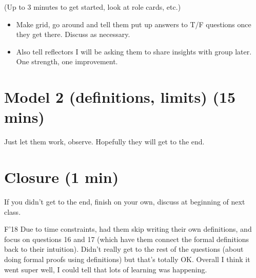 \documentclass{tufte-handout}
\begin{document}
(Up to 3 minutes to get started, look at role cards, etc.)

\begin{itemize}
\item Make grid, go around and tell them put up answers to T/F
  questions once they get there.  Discuss as necessary.
\item Also tell reflectors I will be asking them to share insights
  with group later.  One strength, one improvement.
\end{itemize}

\section{Model 2 (definitions, limits) (15 mins)}

Just let them work, observe.  Hopefully they will get to the end.

\section{Closure (1 min)}

If you didn't get to the end, finish on your own, discuss at
beginning of next class.

\begin{reflect}{F'18}
  Due to time constraints, had them skip writing their own
  definitions, and focus on questions 16 and 17 (which have them
  connect the formal definitions back to their intuition).  Didn't
  really get to the rest of the questions (about doing formal proofs
  using definitions) but that's totally OK.  Overall I think it went
  super well, I could tell that lots of learning was happening.
\end{reflect}
\end{document}
